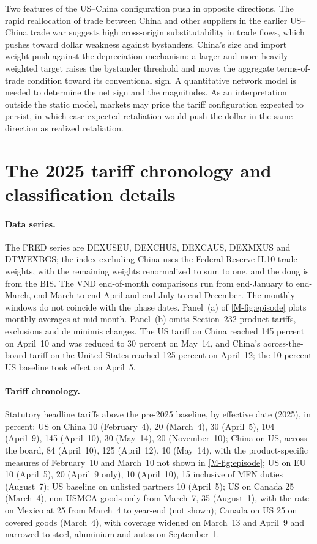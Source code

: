 \documentclass[11pt]{article}
\numberwithin{equation}{section}
\theoremstyle{plain}
\begin{document}
Two features of the US--China configuration push in opposite directions. The rapid reallocation of trade between China and other suppliers in the earlier US--China trade war \citep{fajgelbaum2024,freund2024,alfaro2023} suggests high cross-origin substitutability in trade flows, which pushes toward dollar weakness against bystanders. China's size and import weight push against the depreciation mechanism: a larger and more heavily weighted target raises the bystander threshold and moves the aggregate terms-of-trade condition toward its conventional sign. A quantitative network model is needed to determine the net sign and the magnitudes. As an interpretation outside the static model, markets may price the tariff configuration expected to persist, in which case expected retaliation would push the dollar in the same direction as realized retaliation.

\section{The 2025 tariff chronology and classification details}

\paragraph{Data series.} \sloppy The FRED series are DEXUSEU, DEXCHUS, DEXCAUS, DEXMXUS and DTWEXBGS; the index excluding China uses the Federal Reserve H.10 trade weights, with the remaining weights renormalized to sum to one, and the dong is from the BIS. The VND end-of-month comparisons run from end-January to end-March, end-March to end-April and end-July to end-December. The monthly windows do not coincide with the phase dates. Panel~(a) of \cref{M-fig:episode} plots monthly averages at mid-month. Panel~(b) omits Section~232 product tariffs, exclusions and de minimis changes. The US tariff on China reached 145 percent on April~10 and was reduced to 30 percent on May~14, and China's across-the-board tariff on the United States reached 125 percent on April~12; the 10 percent US baseline took effect on April~5.

\paragraph{Tariff chronology.} Statutory headline tariffs above the pre-2025 baseline, by effective date (2025), in percent: US on China 10 (February~4), 20 (March~4), 30 (April~5), 104 (April~9), 145 (April~10), 30 (May~14), 20 (November~10); China on US, across the board, 84 (April~10), 125 (April~12), 10 (May~14), with the product-specific measures of February~10 and March~10 not shown in \cref{M-fig:episode}; US on EU 10 (April~5), 20 (April~9 only), 10 (April~10), 15 inclusive of MFN duties (August~7); US baseline on unlisted partners 10 (April~5); US on Canada 25 (March~4), non-USMCA goods only from March~7, 35 (August~1), with the rate on Mexico at 25 from March~4 to year-end (not shown); Canada on US 25 on covered goods (March~4), with coverage widened on March~13 and April~9 and narrowed to steel, aluminium and autos on September~1.
\end{document}

